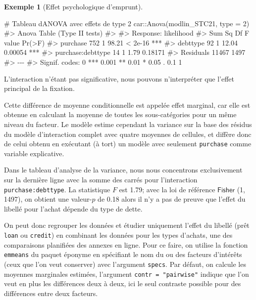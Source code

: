 \documentclass[
  11pt,
  letterpaper,
]{scrbook}
\newenvironment{Shaded}{\begin{snugshade}}{\end{snugshade}}
\newcommand{\AttributeTok}[1]{\textcolor[rgb]{0.40,0.45,0.13}{#1}}
\newcommand{\CommentTok}[1]{\textcolor[rgb]{0.37,0.37,0.37}{#1}}
\newcommand{\DecValTok}[1]{\textcolor[rgb]{0.68,0.00,0.00}{#1}}
\newcommand{\FunctionTok}[1]{\textcolor[rgb]{0.28,0.35,0.67}{#1}}
\newcommand{\NormalTok}[1]{\textcolor[rgb]{0.00,0.23,0.31}{#1}}
\newcommand{\SpecialCharTok}[1]{\textcolor[rgb]{0.37,0.37,0.37}{#1}}
\theoremstyle{plain}
\theoremstyle{plain}
\theoremstyle{definition}
\newtheorem{example}{Exemple}[chapter]
\theoremstyle{definition}
\theoremstyle{remark}
\begin{document}
\begin{example}[Effet psychologique
d'emprunt]
\begin{Shaded}
\begin{Highlighting}[]
\CommentTok{\# Tableau d\textquotesingle{}ANOVA avec effets de type 2}
\NormalTok{car}\SpecialCharTok{::}\FunctionTok{Anova}\NormalTok{(modlin\_STC21, }\AttributeTok{type =} \DecValTok{2}\NormalTok{)}
\CommentTok{\#\textgreater{} Anova Table (Type II tests)}
\CommentTok{\#\textgreater{} }
\CommentTok{\#\textgreater{} Response: likelihood}
\CommentTok{\#\textgreater{}                   Sum Sq   Df F value  Pr(\textgreater{}F)    }
\CommentTok{\#\textgreater{} purchase             752    1   98.21 \textless{} 2e{-}16 ***}
\CommentTok{\#\textgreater{} debttype              92    1   12.04 0.00054 ***}
\CommentTok{\#\textgreater{} purchase:debttype     14    1    1.79 0.18171    }
\CommentTok{\#\textgreater{} Residuals          11467 1497                    }
\CommentTok{\#\textgreater{} {-}{-}{-}}
\CommentTok{\#\textgreater{} Signif. codes:  0 \textquotesingle{}***\textquotesingle{} 0.001 \textquotesingle{}**\textquotesingle{} 0.01 \textquotesingle{}*\textquotesingle{} 0.05 \textquotesingle{}.\textquotesingle{} 0.1 \textquotesingle{} \textquotesingle{} 1}
\end{Highlighting}
\end{Shaded}

L'interaction n'étant pas significative, nous pouvons n'interpréter que
l'effet principal de la fixation.

Cette différence de moyenne conditionnelle est appelée effet marginal,
car elle est obtenue en calculant la moyenne de toutes les
sous-catégories pour un même niveau du facteur. Le modèle estime
cependant la variance sur la base des résidus du modèle d'interaction
complet avec quatre moyennes de cellules, et diffère donc de celui
obtenu en exécutant (à tort) un modèle avec seulement \texttt{purchase}
comme variable explicative.

Dans le tableau d'analyse de la variance, nous nous concentrons
exclusivement sur la dernière ligne avec la somme des carrés pour
l'interaction \texttt{purchase:debttype}. La statistique \(F\) est 1.79;
avec la loi de référence \(\mathsf{Fisher}\) (1, 1497), on obtient une
valeur-\(p\) de 0.18 alors il n'y a pas de preuve que l'effet du libellé
pour l'achat dépende du type de dette.

On peut donc regrouper les données et étudier uniquement l'effet du
libellé (prêt \texttt{loan} ou \texttt{credit}) en combinant les données
pour les types d'achats, une des comparaisons planifiées des annexes en
ligne. Pour ce faire, on utilise la fonction \texttt{emmeans} du paquet
éponyme en spécifiant le nom du ou des facteurs d'intérêts (ceux que
l'on veut conserver) avec l'argument \texttt{specs}. Par défaut, on
calcule les moyennes marginales estimées, l'argument
\texttt{contr\ =\ "pairwise"} indique que l'on veut en plus les
différences deux à deux, ici le seul contraste possible pour des
différences entre deux facteurs.


\end{example}
\end{document}
